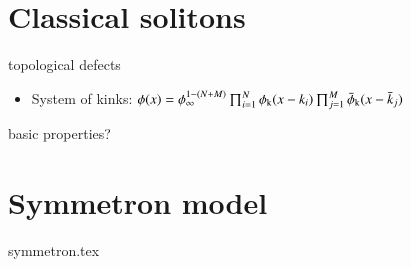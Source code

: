 \section{Classical solitons}\label{sec:CFTgrav:solitons}
    {
        \begin{bullets}
            \item topological defects \begin{itemize}
                \item System of kinks: $\phi(x) = \phi_\infty^{1-(N+M)} \prod_{i=1}^{N} \phi_\mathrm{k}(x-k_i) \prod_{j=1}^{M} \bar{\phi}_\mathrm{k}(x-\bar{k}_j)$ \citep{vachaspatiKinksDomainWalls2006}
            \end{itemize}
            \item basic properties?
        \end{bullets}
    }










\clearpage
\newpage

\section{Symmetron model}\label{sec:CFTgrav:symmetron}
    {{symmetron.tex}}




